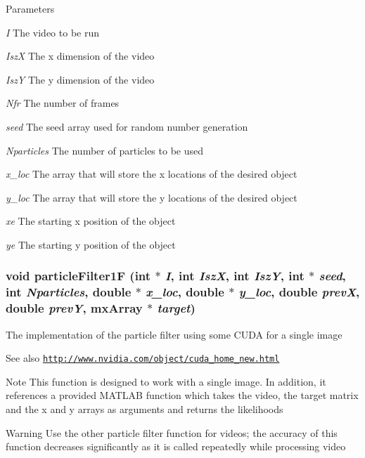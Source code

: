 \begin{DoxyParams}{Parameters}
\item[{\em I}]The video to be run \item[{\em IszX}]The x dimension of the video \item[{\em IszY}]The y dimension of the video \item[{\em Nfr}]The number of frames \item[{\em seed}]The seed array used for random number generation \item[{\em Nparticles}]The number of particles to be used \item[{\em x\_\-loc}]The array that will store the x locations of the desired object \item[{\em y\_\-loc}]The array that will store the y locations of the desired object \item[{\em xe}]The starting x position of the object \item[{\em ye}]The starting y position of the object \end{DoxyParams}
\hypertarget{ex__particle__CUDA__naive__full_8cu_a822a6fc6a33cafc1167c91a7314623e8}{
\subsubsection[{particleFilter1F}]{\setlength{\rightskip}{0pt plus 5cm}void particleFilter1F (int $\ast$ {\em I}, \/  int {\em IszX}, \/  int {\em IszY}, \/  int $\ast$ {\em seed}, \/  int {\em Nparticles}, \/  double $\ast$ {\em x\_\-loc}, \/  double $\ast$ {\em y\_\-loc}, \/  double {\em prevX}, \/  double {\em prevY}, \/  mxArray $\ast$ {\em target})}}
\label{ex__particle__CUDA__naive__full_8cu_a822a6fc6a33cafc1167c91a7314623e8}
The implementation of the particle filter using some CUDA for a single image \begin{DoxySeeAlso}{See also}
\href{http://www.nvidia.com/object/cuda_home_new.html}{\tt http://www.nvidia.com/object/cuda\_\-home\_\-new.html} 
\end{DoxySeeAlso}
\begin{DoxyNote}{Note}
This function is designed to work with a single image. In addition, it references a provided MATLAB function which takes the video, the target matrix and the x and y arrays as arguments and returns the likelihoods 
\end{DoxyNote}
\begin{DoxyWarning}{Warning}
Use the other particle filter function for videos; the accuracy of this function decreases significantly as it is called repeatedly while processing video 
\end{DoxyWarning}

